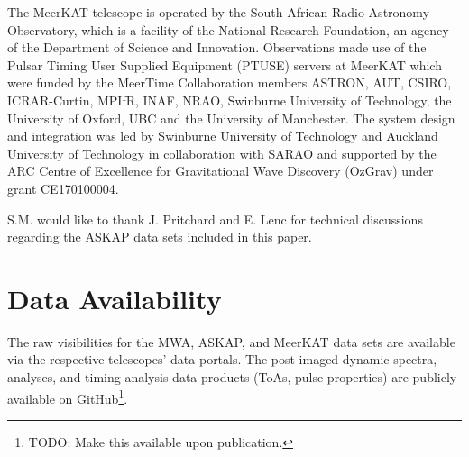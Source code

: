 \documentclass[fleqn,usenatbib]{mnras}
\begin{document}
The MeerKAT telescope is operated by the South African Radio Astronomy Observatory, which is a facility of the National Research Foundation, an agency of the Department of Science and Innovation.
Observations made use of the Pulsar Timing User Supplied Equipment (PTUSE) servers at MeerKAT which were funded by the MeerTime Collaboration members ASTRON, AUT, CSIRO, ICRAR-Curtin, MPIfR, INAF, NRAO, Swinburne University of Technology, the University of Oxford, UBC and the University of Manchester.  The system design and integration was led by Swinburne University of Technology and Auckland University of Technology in collaboration with SARAO and supported by the ARC Centre of Excellence for Gravitational Wave Discovery (OzGrav) under grant CE170100004.

S.M. would like to thank J. Pritchard and E. Lenc for technical discussions regarding the ASKAP data sets included in this paper.

\section*{Data Availability}

The raw visibilities for the MWA, ASKAP, and MeerKAT data sets are available via the respective telescopes' data portals. 
The post-imaged dynamic spectra, analyses, and timing analysis data products (ToAs, pulse properties) are publicly available on GitHub\footnote{TODO: Make this available upon publication.}.
 






\end{document}
